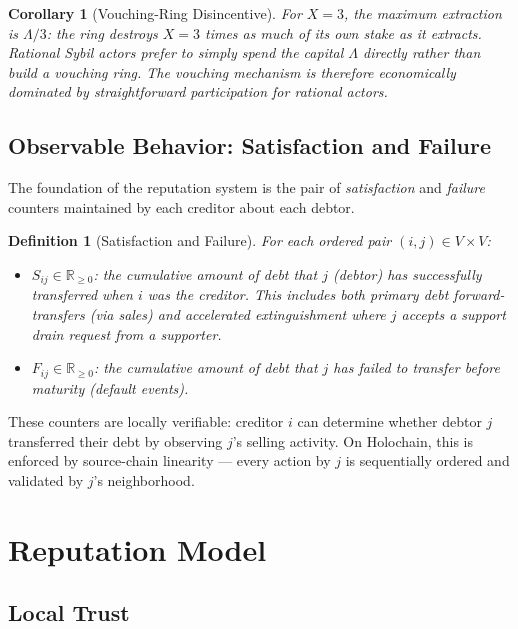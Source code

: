 \documentclass[11pt]{article}
\newtheorem{definition}[theorem]{Definition}
\newtheorem{corollary}[theorem]{Corollary}
\begin{document}
\begin{corollary}[Vouching-Ring Disincentive]
For $X = 3$, the maximum extraction is $\Lambda/3$: the ring destroys $X = 3$ times as much of its own stake as it extracts. Rational Sybil actors prefer to simply spend the capital $\Lambda$ directly rather than build a vouching ring. The vouching mechanism is therefore economically dominated by straightforward participation for rational actors.
\end{corollary}

\subsection{Observable Behavior: Satisfaction and Failure}

The foundation of the reputation system is the pair of \emph{satisfaction} and \emph{failure} counters maintained by each creditor about each debtor.

\begin{definition}[Satisfaction and Failure]
For each ordered pair $(i, j) \in V \times V$:
\begin{itemize}
    \item $S_{ij} \in \mathbb{R}_{\geq 0}$: the cumulative amount of debt that $j$ (debtor) has successfully \emph{transferred} when $i$ was the creditor. This includes both primary debt forward-transfers (via sales) and \emph{accelerated extinguishment} where $j$ accepts a support drain request from a supporter.
    \item $F_{ij} \in \mathbb{R}_{\geq 0}$: the cumulative amount of debt that $j$ has \emph{failed} to transfer before maturity (default events).
\end{itemize}
\end{definition}

These counters are locally verifiable: creditor $i$ can determine whether debtor $j$ transferred their debt by observing $j$'s selling activity. On Holochain, this is enforced by source-chain linearity --- every action by $j$ is sequentially ordered and validated by $j$'s neighborhood.

\section{Reputation Model}
\label{sec:reputation}

\subsection{Local Trust}
\end{document}
